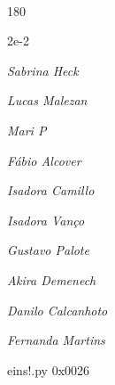 \documentclass[12pt]{article}
\begin{document}

\pagebreak			

	\ 
	\vfill
	\begin{turn}{180}	
		\begin{minipage}{\textwidth}
		  	\ttfamily %
			\centering
			{\Huge 2e-2}
		  
			\hfill
		  
			

\textit{\small Sabrina Heck}

\textit{\small Lucas Malezan}

\textit{\small Mari P}

\textit{\small Fábio Alcover}

\textit{\small Isadora Camillo}

\textit{\small Isadora Vanço}

\textit{\small Gustavo Palote}

\textit{\small Akira Demenech}

\textit{\small Danilo Calcanhoto}

\textit{\small Fernanda Martins}

\bigskip

eins!.py
0x0026


		\end{minipage}	
	\end{turn}
	\vfill
	\

\pagebreak
\end{document}
